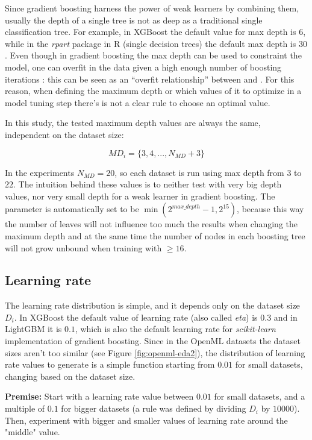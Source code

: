 Since gradient boosting harness the power of weak learners by combining them, usually the depth of a single tree is not as deep as a traditional single classification tree. For example, in XGBoost the default value for max depth is $6$, while in the \textit{rpart} package in R (single decision trees) the default max depth is $30$. Even though in gradient boosting the max depth can be used to constraint the model, one can overfit in the data given a high enough number of boosting iterations : this can be seen as an ``overfit relationship'' between  and . For this reason, when defining the maximum depth or which values of it to optimize in a model tuning step there's is not a clear rule to choose an optimal value. 

In this study, the tested maximum depth values are always the same, independent on the dataset size:

$$MD_i = \{3, 4, ..., N_{MD} + 3\}$$

In the experiments $N_{MD} = 20$, so each dataset is run using max depth from $3$ to $22$. The intuition behind these values is to neither test with very big depth values, nor very small depth for a weak learner in gradient boosting. The  parameter is automatically set to be $\min(2^{max\_depth} - 1, 2^{15})$, because this way the number of leaves will not influence too much the results when changing the maximum depth and at the same time the number of nodes in each boosting tree will not grow unbound when training with  $\geq 16$.

\subsection{Learning rate}

The learning rate distribution is simple, and it depends only on the dataset size $D_i$. In XGBoost the default value of learning rate (also called \textit{eta}) is $0.3$ and in LightGBM it is $0.1$, which is also the default learning rate for \textit{scikit-learn} implementation of gradient boosting. Since in the OpenML datasets the dataset sizes aren't too similar (see Figure \ref{fig:openml-eda2}), the distribution of learning rate values to generate is a simple function starting from $0.01$ for small datasets, changing based on the dataset size.

\textbf{Premise:} Start with a learning rate value between $0.01$ for small datasets, and a multiple of $0.1$ for bigger datasets (a rule was defined by dividing $D_i$ by $10000$). Then, experiment with bigger and smaller values of learning rate around the "middle" value.

